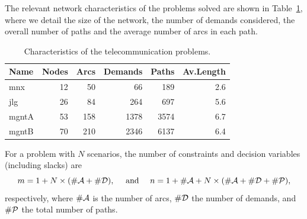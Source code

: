 The relevant network characteristics of the problems solved are shown 
in Table~\ref{table:ProblemData}, where we detail the size of the network, 
the number of demands considered, the overall number of paths and the
average number of arcs in each path.
%
%
%
\begin{table}[ht]
  \begin{center}
    \begin{tabular}{|l||r|r|r|r|r|} \hline
      Name      & Nodes & Arcs & Demands & Paths & Av.Length \\ \hline\hline
      mnx       &    12 &   50 &     66  &   189 & 2.6 \\
      jlg       &    26 &   84 &    264  &   697 & 5.6 \\
      mgntA     &    53 &  158 &   1378  &  3574 & 6.7 \\
      mgntB     &    70 &  210 &   2346  &  6137 & 6.4 \\ \hline
    \end{tabular}
    \caption{Characteristics of the telecommunication problems.}
    \label{table:ProblemData}
  \end{center} \vspace{-3ex}
\end{table}

\noindent For a problem with $N$ scenarios, the number of constraints and 
decision variables (including slacks) are
\[
m = 1 + N \times (\#{\cal A} + \#{\cal D}), \quad \mbox{ and } \quad
n = 1 + \#{\cal A} + N \times (\#{\cal A} + \#{\cal D} + \#{\cal P}),
\]
respectively, where $\#{\cal A}$ is the number of arcs, $\#{\cal D}$ 
the number of demands, and $\#{\cal P}$ the total number of paths.

